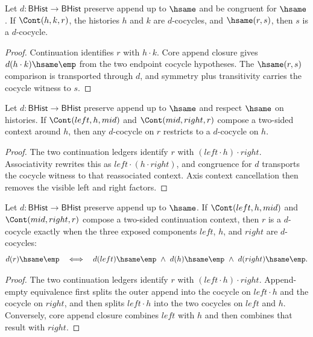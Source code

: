 \begin{theorem}
\label{thm:cohomology-cocycle-continuation-hsame-transport}
Let $d:\mathsf{BHist}\to\mathsf{BHist}$ preserve append up to $\hsame$ and
be congruent for $\hsame$. If $\Cont(h,k,r)$, the histories $h$ and $k$ are
$d$-cocycles, and $\hsame(r,s)$, then $s$ is a $d$-cocycle.
\end{theorem}
\begin{proof}
Continuation identifies $r$ with $h\cdot k$. Core append closure gives
$d(h\cdot k)\hsame\emp$ from the two endpoint cocycle hypotheses. The
$\hsame(r,s)$ comparison is transported through $d$, and symmetry plus
transitivity carries the cocycle witness to $s$.
\end{proof}

\begin{theorem}
\label{thm:cohomology-cocycle-continuation-context-cancel}
Let $d:\mathsf{BHist}\to\mathsf{BHist}$ preserve append up to $\hsame$ and
respect $\hsame$ on histories. If $\Cont(left,h,mid)$ and
$\Cont(mid,right,r)$ compose a two-sided context around $h$, then any
$d$-cocycle on $r$ restricts to a $d$-cocycle on $h$.
\end{theorem}
\begin{proof}
The two continuation ledgers identify $r$ with $(left\cdot h)\cdot right$.
Associativity rewrites this as $left\cdot(h\cdot right)$, and congruence for
$d$ transports the cocycle witness to that reassociated context. Axis context
cancellation then removes the visible left and right factors.
\end{proof}

\begin{theorem}
\label{thm:cohomology-cocycle-continuation-context-empty-iff}
Let $d:\mathsf{BHist}\to\mathsf{BHist}$ preserve append up to $\hsame$. If
$\Cont(left,h,mid)$ and $\Cont(mid,right,r)$ compose a two-sided continuation
context, then $r$ is a $d$-cocycle exactly when the three exposed components
$left$, $h$, and $right$ are $d$-cocycles:
$$
d(r)\hsame\emp
\quad\Longleftrightarrow\quad
d(left)\hsame\emp\ \wedge\ d(h)\hsame\emp\ \wedge\ d(right)\hsame\emp.
$$
\end{theorem}
\begin{proof}
The two continuation ledgers identify $r$ with $(left\cdot h)\cdot right$.
Append-empty equivalence first splits the outer append into the cocycle on
$left\cdot h$ and the cocycle on $right$, and then splits $left\cdot h$ into
the two cocycles on $left$ and $h$. Conversely, core append closure combines
$left$ with $h$ and then combines that result with $right$.
\end{proof}


